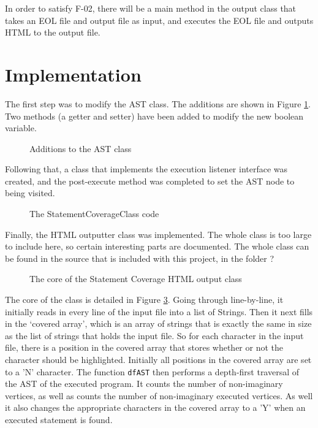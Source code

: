 In order to satisfy F-02, there will be a main method in the output class that takes an EOL file and output file as input, and executes the EOL file and outputs HTML to the output file.

\section{Implementation}

The first step was to modify the AST class. The additions are shown in Figure \ref{lst:ASTStatementAdditions}. Two methods (a getter and setter) have been added to modify the new boolean variable.

\begin{figure}[h]
	
	\caption{Additions to the AST class}
	\label{lst:ASTStatementAdditions}
\end{figure}

Following that, a class that implements the execution listener interface was created, and the post-execute method was completed to set the AST node to being visited.

\begin{figure}[h]
	
	\caption{The StatementCoverageClass code}
	\label{lst:StatementCoverageListener}
\end{figure}

Finally, the HTML outputter class was implemented. The whole class is too large to include here, so certain interesting parts are documented. The whole class can be found in the source that is included with this project, in the folder ?


\begin{figure}[h]
	
	\caption{The core of the Statement Coverage HTML output class}
	\label{lst:StatementCoverageHTMLCore}
\end{figure}

The core of the class is detailed in Figure \ref{lst:StatementCoverageHTMLCore}. Going through line-by-line, it initially reads in every line of the input file into a list of Strings. Then it next fills in the `covered array', which is an array of strings that is exactly the same in size as the list of strings that holds the input file. So for each character in the input file, there is a position in the covered array that stores whether or not the character should be highlighted. Initially all positions in the covered array are set to a 'N' character. The function \verb|dfAST| then performs a depth-first traversal of the AST of the executed program. It counts the number of non-imaginary vertices, as well as counts the number of non-imaginary executed vertices. As well it also changes the appropriate characters in the covered array to a 'Y' when an executed statement is found. 

